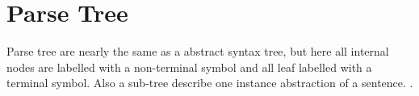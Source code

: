


\section{Parse Tree}
Parse tree are nearly the same as a abstract syntax tree, but here all internal nodes are labelled with a non-terminal symbol and all leaf labelled with a terminal symbol. Also a sub-tree describe one instance abstraction of a sentence. \citep{sebesta}.



